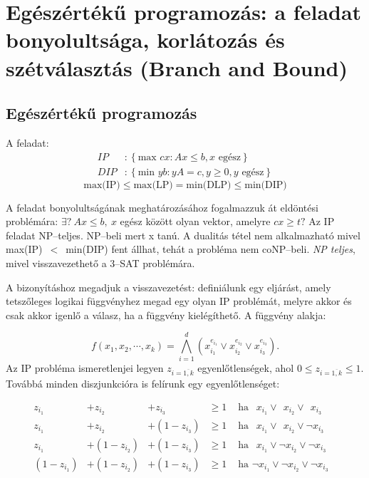 \newpage
\section{Egészértékű programozás: a feladat bonyolultsága, korlátozás és szétválasztás (Branch and Bound)}

\subsection{Egészértékű programozás}
A feladat:
\begin{align*}
IP &: \left\{\mbox{max }{cx: Ax \leq b, x \mbox{ egész}}\right\} \\
DIP &: \left\{ \mbox{min }{yb: yA=c, y \geq 0, y \mbox{ egész}}\right\}
\end{align*}
\[ \mbox{max(IP)} \leq \mbox{max(LP)}= \mbox{min(DLP)} \leq \mbox{min(DIP)} \]

A feladat bonyolultságának meghatározásához fogalmazzuk át eldöntési problémára:
$\exists?~Ax \leq b,~ x$ egész között olyan vektor, amelyre $cx \geq t?$ Az IP
feladat NP--teljes. NP--beli mert x tanú. A dualitás tétel nem alkalmazható
mivel max(IP)~$<$~min(DIP) fent állhat, tehát a probléma nem coNP--beli. \emph{NP
teljes}, mivel visszavezethető a $3$--SAT problémára.

A bizonyításhoz megadjuk a visszavezetést: definiálunk egy eljárást, amely tetszőleges
logikai függvényhez megad egy olyan IP problémát, melyre akkor és csak akkor igenlő a
válasz, ha a függvény kielégíthető. A függvény alakja:

\[ f(x_1, x_2, \cdots, x_k) = \bigwedge_{i=1}^{d}{\left( x_{i_1}^{e_{i_1}} \vee 
x_{i_2}^{e_{i_2}} \vee x_{i_3}^{e_{i_3}}\right).} 
\]
Az IP probléma ismeretlenjei legyen $z_{i=\overline{1,k}}$ egyenlőtlenségek, ahol 
$0 \leq z_{i=\overline{1,k}} \leq 1$. Továbbá minden diszjunkcióra is felírunk egy
egyenlőtlenséget:


\begin{align*}
z_{i_1} &+ z_{i_2} &+      z_{i_3}  &\geq 1 & \mbox{ ha }~~x_{i_1} \vee~~x_{i_2}\vee~~x_{i_3}& \\
z_{i_1} &+ z_{i_2} &+ (1 - z_{i_3}) &\geq 1 & \mbox{ ha }~~x_{i_1} \vee~~x_{i_2} \vee \neg x_{i_3}& \\
z_{i_1} &+ (1-z_{i_2}) &+ (1 - z_{i_3})  &\geq 1 & \mbox{ ha }~~x_{i_1} \vee \neg x_{i_2} \vee\neg x_{i_3}&\\
(1-z_{i_1}) &+ (1-z_{i_2}) &+ (1 - z_{i_3})  &\geq 1 & \mbox{ ha } \neg x_{i_1} \vee \neg x_{i_2} \vee \neg x_{i_3}&
\end{align*}

